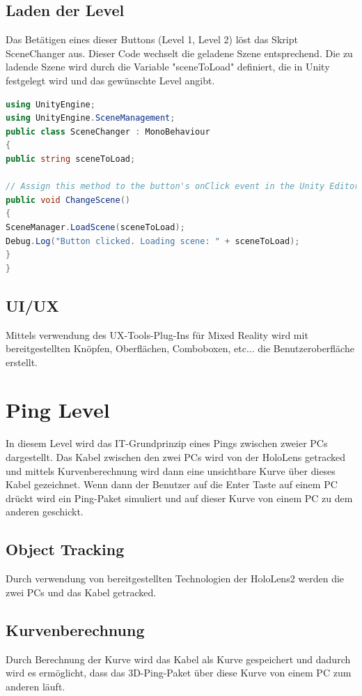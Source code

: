 \subsection{Laden der Level}
Das Betätigen eines dieser Buttons (Level 1, Level 2) löst das Skript SceneChanger aus. Dieser Code wechselt die geladene
Szene entsprechend. Die zu ladende Szene wird durch die Variable "sceneToLoad" definiert, die in Unity
festgelegt wird und das gewünschte Level angibt.


\begin{lstlisting}[language=C#, style=csharpstyle, caption=Auf Knopfdruck Szene wechseln.]
using UnityEngine;
using UnityEngine.SceneManagement;
public class SceneChanger : MonoBehaviour
{
public string sceneToLoad;

// Assign this method to the button's onClick event in the Unity Editor.
public void ChangeScene()
{
SceneManager.LoadScene(sceneToLoad);
Debug.Log("Button clicked. Loading scene: " + sceneToLoad);
}
}
\end{lstlisting}

\subsection{UI/UX}
Mittels verwendung des UX-Tools-Plug-Ins für Mixed Reality wird
mit bereitgestellten Knöpfen, Oberflächen, Comboboxen, etc...
die Benutzeroberfläche erstellt.

\section{Ping Level}
In diesem Level wird das IT-Grundprinzip eines Pings zwischen zweier
PCs dargestellt. Das Kabel zwischen den zwei PCs wird von der
HoloLens getracked und mittels Kurvenberechnung wird dann eine
unsichtbare Kurve über dieses Kabel gezeichnet. Wenn dann der Benutzer
auf die Enter Taste auf einem PC drückt wird ein Ping-Paket simuliert
und auf dieser Kurve von einem PC zu dem anderen geschickt.

\subsection{Object Tracking}
Durch verwendung von bereitgestellten Technologien der HoloLens2
werden die zwei PCs und das Kabel getracked.

\subsection{Kurvenberechnung}
Durch Berechnung der Kurve wird das Kabel als Kurve gespeichert
und dadurch wird es ermöglicht, dass das 3D-Ping-Paket über diese
Kurve von einem PC zum anderen läuft.

